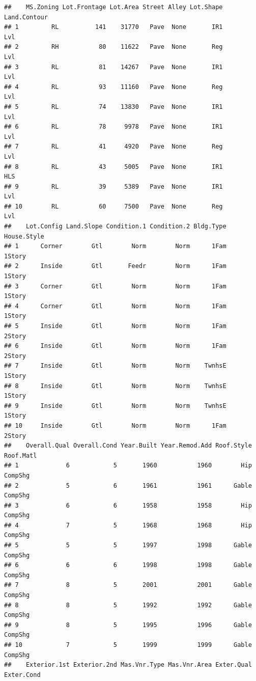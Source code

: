 \documentclass[
]{article}
\begin{document}
\begin{verbatim}
##    MS.Zoning Lot.Frontage Lot.Area Street Alley Lot.Shape Land.Contour
## 1         RL          141    31770   Pave  None       IR1          Lvl
## 2         RH           80    11622   Pave  None       Reg          Lvl
## 3         RL           81    14267   Pave  None       IR1          Lvl
## 4         RL           93    11160   Pave  None       Reg          Lvl
## 5         RL           74    13830   Pave  None       IR1          Lvl
## 6         RL           78     9978   Pave  None       IR1          Lvl
## 7         RL           41     4920   Pave  None       Reg          Lvl
## 8         RL           43     5005   Pave  None       IR1          HLS
## 9         RL           39     5389   Pave  None       IR1          Lvl
## 10        RL           60     7500   Pave  None       Reg          Lvl
##    Lot.Config Land.Slope Condition.1 Condition.2 Bldg.Type House.Style
## 1      Corner        Gtl        Norm        Norm      1Fam      1Story
## 2      Inside        Gtl       Feedr        Norm      1Fam      1Story
## 3      Corner        Gtl        Norm        Norm      1Fam      1Story
## 4      Corner        Gtl        Norm        Norm      1Fam      1Story
## 5      Inside        Gtl        Norm        Norm      1Fam      2Story
## 6      Inside        Gtl        Norm        Norm      1Fam      2Story
## 7      Inside        Gtl        Norm        Norm    TwnhsE      1Story
## 8      Inside        Gtl        Norm        Norm    TwnhsE      1Story
## 9      Inside        Gtl        Norm        Norm    TwnhsE      1Story
## 10     Inside        Gtl        Norm        Norm      1Fam      2Story
##    Overall.Qual Overall.Cond Year.Built Year.Remod.Add Roof.Style Roof.Matl
## 1             6            5       1960           1960        Hip   CompShg
## 2             5            6       1961           1961      Gable   CompShg
## 3             6            6       1958           1958        Hip   CompShg
## 4             7            5       1968           1968        Hip   CompShg
## 5             5            5       1997           1998      Gable   CompShg
## 6             6            6       1998           1998      Gable   CompShg
## 7             8            5       2001           2001      Gable   CompShg
## 8             8            5       1992           1992      Gable   CompShg
## 9             8            5       1995           1996      Gable   CompShg
## 10            7            5       1999           1999      Gable   CompShg
##    Exterior.1st Exterior.2nd Mas.Vnr.Type Mas.Vnr.Area Exter.Qual Exter.Cond

\end{verbatim}
\end{document}
